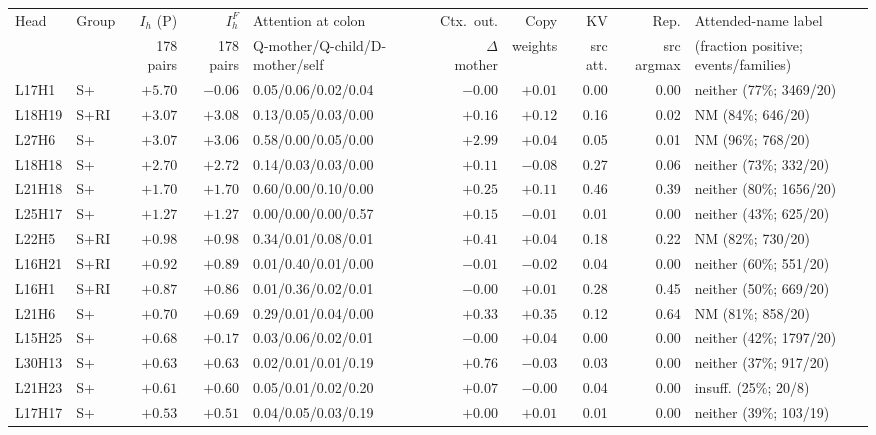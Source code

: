\begin{table}[p]
\centering\scriptsize
\setlength{\tabcolsep}{3.5pt}
\begin{tabular}{llrrlrrrrl}
\toprule
Head & Group & $I_h$ (P) & $I_h^{F}$ & Attention at colon & Ctx.\ out. & Copy & KV & Rep. & Attended-name label \\
 & & 178 pairs & 178 pairs & Q-mother/Q-child/D-mother/self & $\Delta$ mother & weights & src att. & src argmax & (fraction positive; events/families) \\
\midrule
L17H1 & S+ & $+5.70$ & $-0.06$ & 0.05/0.06/0.02/0.04 & $-0.00$ & $+0.01$ & 0.00 & 0.00 & neither (77\%; 3469/20) \\
L18H19 & S+RI & $+3.07$ & $+3.08$ & 0.13/0.05/0.03/0.00 & $+0.16$ & $+0.12$ & 0.16 & 0.02 & NM (84\%; 646/20) \\
L27H6 & S+ & $+3.07$ & $+3.06$ & 0.58/0.00/0.05/0.00 & $+2.99$ & $+0.04$ & 0.05 & 0.01 & NM (96\%; 768/20) \\
L18H18 & S+ & $+2.70$ & $+2.72$ & 0.14/0.03/0.03/0.00 & $+0.11$ & $-0.08$ & 0.27 & 0.06 & neither (73\%; 332/20) \\
L21H18 & S+ & $+1.70$ & $+1.70$ & 0.60/0.00/0.10/0.00 & $+0.25$ & $+0.11$ & 0.46 & 0.39 & neither (80\%; 1656/20) \\
L25H17 & S+ & $+1.27$ & $+1.27$ & 0.00/0.00/0.00/0.57 & $+0.15$ & $-0.01$ & 0.01 & 0.00 & neither (43\%; 625/20) \\
L22H5 & S+RI & $+0.98$ & $+0.98$ & 0.34/0.01/0.08/0.01 & $+0.41$ & $+0.04$ & 0.18 & 0.22 & NM (82\%; 730/20) \\
L16H21 & S+RI & $+0.92$ & $+0.89$ & 0.01/0.40/0.01/0.00 & $-0.01$ & $-0.02$ & 0.04 & 0.00 & neither (60\%; 551/20) \\
L16H1 & S+RI & $+0.87$ & $+0.86$ & 0.01/0.36/0.02/0.01 & $-0.00$ & $+0.01$ & 0.28 & 0.45 & neither (50\%; 669/20) \\
L21H6 & S+ & $+0.70$ & $+0.69$ & 0.29/0.01/0.04/0.00 & $+0.33$ & $+0.35$ & 0.12 & 0.64 & NM (81\%; 858/20) \\
L15H25 & S+ & $+0.68$ & $+0.17$ & 0.03/0.06/0.02/0.01 & $-0.00$ & $+0.04$ & 0.00 & 0.00 & neither (42\%; 1797/20) \\
L30H13 & S+ & $+0.63$ & $+0.63$ & 0.02/0.01/0.01/0.19 & $+0.76$ & $-0.03$ & 0.03 & 0.00 & neither (37\%; 917/20) \\
L21H23 & S+ & $+0.61$ & $+0.60$ & 0.05/0.01/0.02/0.20 & $+0.07$ & $-0.00$ & 0.04 & 0.00 & insuff. (25\%; 20/8) \\
L17H17 & S+ & $+0.53$ & $+0.51$ & 0.04/0.05/0.03/0.19 & $+0.00$ & $+0.01$ & 0.01 & 0.00 & neither (39\%; 103/19) \\

\end{tabular}
\end{table}
